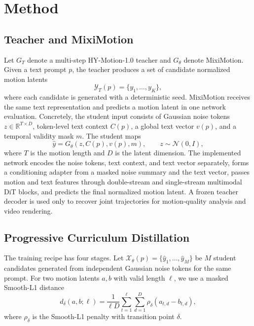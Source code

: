 \documentclass[runningheads]{llncs}
\begin{document}
\section{Method}

\subsection{Teacher and MixiMotion}

Let $G_T$ denote a multi-step HY-Motion-1.0 teacher and $G_\theta$ denote
MixiMotion. Given a text prompt $p$, the teacher produces a set of candidate
normalized motion latents
\begin{equation}
  \mathcal{Y}_T(p) = \{y_1, \ldots, y_K\},
\end{equation}
where each candidate is generated with a deterministic seed. MixiMotion
receives the same text representation and predicts a motion latent in one
network evaluation. Concretely, the student input consists of Gaussian noise
tokens $z \in \mathbb{R}^{T \times D}$, token-level text context $C(p)$, a
global text vector $v(p)$, and a temporal validity mask $m$. The student maps
\begin{equation}
  \hat{y} = G_\theta(z, C(p), v(p), m), \qquad z \sim \mathcal{N}(0, I),
\end{equation}
where $T$ is the motion length and $D$ is the latent dimension. The implemented
network encodes the noise tokens, text context, and text vector separately,
forms a conditioning adapter from a masked noise summary and the text vector,
passes motion and text features through double-stream and single-stream
multimodal DiT blocks, and predicts the final normalized motion latent. A
frozen teacher decoder is used only to recover joint trajectories for
motion-quality analysis and video rendering.

\subsection{Progressive Curriculum Distillation}

The training recipe has four stages. Let
$\mathcal{X}_\theta(p)=\{\hat{y}_1,\ldots,\hat{y}_M\}$ be $M$ student
candidates generated from independent Gaussian noise tokens for the same
prompt. For two motion latents $a,b$ with valid length $\ell$, we use a masked
Smooth-L1 distance
\begin{equation}
  d_\delta(a,b;\ell)
  = \frac{1}{\ell D} \sum_{t=1}^{\ell} \sum_{d=1}^{D}
  \rho_\delta(a_{t,d}-b_{t,d}),
\end{equation}
where $\rho_\delta$ is the Smooth-L1 penalty with transition point $\delta$.
\end{document}
